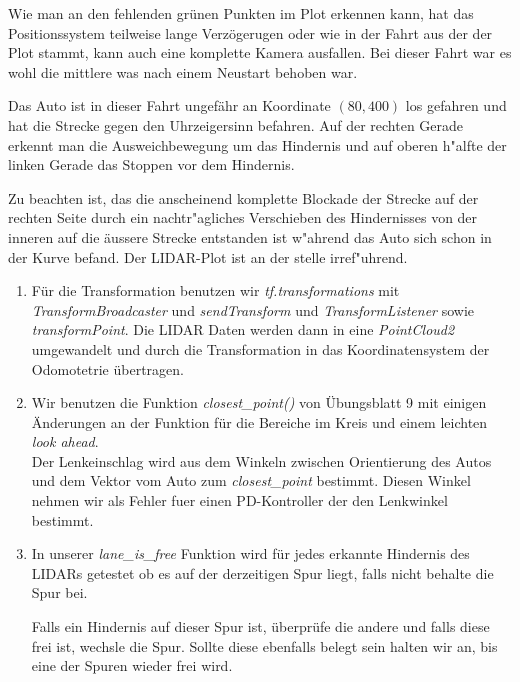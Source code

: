 \documentclass[10pt,oneside,a4paper]{article}
\begin{document}
    Wie man an den fehlenden gr\"unen Punkten im Plot erkennen kann, hat das Positionssystem
    teilweise lange Verz\"ogerugen oder wie in der Fahrt aus der der Plot stammt, kann auch eine
    komplette Kamera ausfallen. Bei dieser Fahrt war es wohl die mittlere was nach einem Neustart
    behoben war.

    Das Auto ist in dieser Fahrt ungef\"ahr an Koordinate $(80, 400)$ los gefahren und hat die
    Strecke gegen den Uhrzeigersinn befahren. Auf der rechten Gerade erkennt man die
    Ausweichbewegung um das Hindernis und auf oberen h"alfte der linken Gerade das Stoppen vor dem
    Hindernis.

    Zu beachten ist, das die anscheinend komplette Blockade der Strecke auf der rechten Seite durch
    ein nachtr"agliches Verschieben des Hindernisses von der inneren auf die \"aussere Strecke
    entstanden ist w"ahrend das Auto sich schon in der Kurve befand. Der LIDAR-Plot ist an der
    stelle irref"uhrend.
	\begin{enumerate}
    \item Für die Transformation benutzen wir \emph{tf.transformations} mit
      \emph{TransformBroadcaster} und \emph{sendTransform} und \emph{TransformListener} sowie
      \emph{transformPoint}. Die LIDAR Daten werden dann in eine \emph{PointCloud2} umgewandelt und
      durch die Transformation in das Koordinatensystem der Odomotetrie \"ubertragen.
    \item Wir benutzen die Funktion \emph{closest\_point()} von Übungsblatt 9 mit einigen Änderungen
      an der Funktion für die Bereiche im Kreis und einem leichten \emph{look ahead}.\\
      Der Lenkeinschlag wird aus dem Winkeln zwischen Orientierung des Autos und dem Vektor vom Auto
      zum \emph{closest\_point} bestimmt. Diesen Winkel nehmen wir als Fehler fuer einen
      PD-Kontroller der den Lenkwinkel bestimmt.
    \item In unserer \emph{lane\_is\_free} Funktion wird f\"ur jedes erkannte Hindernis
      des LIDARs getestet ob es auf der derzeitigen Spur liegt, falls nicht behalte die Spur bei.

      Falls ein Hindernis auf dieser Spur ist, \"uberpr\"ufe die andere und falls diese frei ist,
      wechsle die Spur. Sollte diese ebenfalls belegt sein halten wir an, bis eine der Spuren wieder
      frei wird.
	\end{enumerate}
\end{document}
